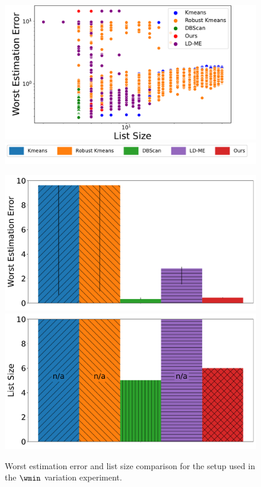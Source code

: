 \begin{figure}[b]
    \centering
    \begin{minipage}[t]{\linewidth}
        \centering
        \includegraphics[width=0.4\linewidth]{chapters/robust/figures/wlow_variation_scatter_cropped.pdf}
        \vspace{3mm}
    \end{minipage}
    \begin{minipage}[t]{0.8\linewidth}
        \includegraphics[width=0.99\linewidth]{chapters/robust/figures/new_legend.pdf}
        \end{minipage}
    \begin{minipage}[t]{\linewidth}
        \includegraphics[width=0.4\linewidth]{chapters/robust/figures/wlow_variation_1_attack_error.pdf}
        \includegraphics[width=0.4\linewidth]{chapters/robust/figures/wlow_variation_1_attack_size.pdf}
    \end{minipage}
    \caption{Worst estimation error and list size comparison for the setup used in the \(\wmin\) variation experiment.}
    \label{fig:wlow_variation_bar_plots}
\end{figure}

